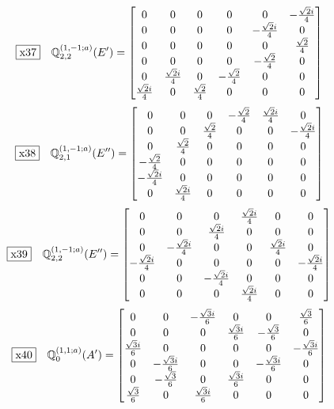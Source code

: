 \documentclass[fleqn,10pt,landscape]{jsarticle}
\begin{document}
\begin{dmath*}
\fbox{x37}\quad \mathbb{Q}_{2,2}^{(1,-1;a)}(E^{\prime})=\begin{bmatrix} 0 & 0 & 0 & 0 & 0 & - \frac{\sqrt{2} i}{4} \\ 0 & 0 & 0 & 0 & - \frac{\sqrt{2} i}{4} & 0 \\ 0 & 0 & 0 & 0 & 0 & \frac{\sqrt{2}}{4} \\ 0 & 0 & 0 & 0 & - \frac{\sqrt{2}}{4} & 0 \\ 0 & \frac{\sqrt{2} i}{4} & 0 & - \frac{\sqrt{2}}{4} & 0 & 0 \\ \frac{\sqrt{2} i}{4} & 0 & \frac{\sqrt{2}}{4} & 0 & 0 & 0 \end{bmatrix}
\end{dmath*}
\begin{dmath*}
\fbox{x38}\quad \mathbb{Q}_{2,1}^{(1,-1;a)}(E^{\prime\prime})=\begin{bmatrix} 0 & 0 & 0 & - \frac{\sqrt{2}}{4} & \frac{\sqrt{2} i}{4} & 0 \\ 0 & 0 & \frac{\sqrt{2}}{4} & 0 & 0 & - \frac{\sqrt{2} i}{4} \\ 0 & \frac{\sqrt{2}}{4} & 0 & 0 & 0 & 0 \\ - \frac{\sqrt{2}}{4} & 0 & 0 & 0 & 0 & 0 \\ - \frac{\sqrt{2} i}{4} & 0 & 0 & 0 & 0 & 0 \\ 0 & \frac{\sqrt{2} i}{4} & 0 & 0 & 0 & 0 \end{bmatrix}
\end{dmath*}
\begin{dmath*}
\fbox{x39}\quad \mathbb{Q}_{2,2}^{(1,-1;a)}(E^{\prime\prime})=\begin{bmatrix} 0 & 0 & 0 & \frac{\sqrt{2} i}{4} & 0 & 0 \\ 0 & 0 & \frac{\sqrt{2} i}{4} & 0 & 0 & 0 \\ 0 & - \frac{\sqrt{2} i}{4} & 0 & 0 & \frac{\sqrt{2} i}{4} & 0 \\ - \frac{\sqrt{2} i}{4} & 0 & 0 & 0 & 0 & - \frac{\sqrt{2} i}{4} \\ 0 & 0 & - \frac{\sqrt{2} i}{4} & 0 & 0 & 0 \\ 0 & 0 & 0 & \frac{\sqrt{2} i}{4} & 0 & 0 \end{bmatrix}
\end{dmath*}
\begin{dmath*}
\fbox{x40}\quad \mathbb{Q}_{0}^{(1,1;a)}(A^{\prime})=\begin{bmatrix} 0 & 0 & - \frac{\sqrt{3} i}{6} & 0 & 0 & \frac{\sqrt{3}}{6} \\ 0 & 0 & 0 & \frac{\sqrt{3} i}{6} & - \frac{\sqrt{3}}{6} & 0 \\ \frac{\sqrt{3} i}{6} & 0 & 0 & 0 & 0 & - \frac{\sqrt{3} i}{6} \\ 0 & - \frac{\sqrt{3} i}{6} & 0 & 0 & - \frac{\sqrt{3} i}{6} & 0 \\ 0 & - \frac{\sqrt{3}}{6} & 0 & \frac{\sqrt{3} i}{6} & 0 & 0 \\ \frac{\sqrt{3}}{6} & 0 & \frac{\sqrt{3} i}{6} & 0 & 0 & 0 \end{bmatrix}
\end{dmath*}
\end{document}
